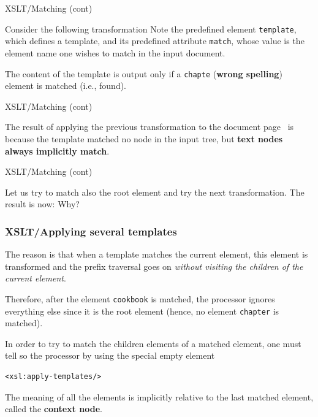 %
\begin{frame}{XSLT/Matching (cont)}

Consider the following \XSLT transformation
Note the \XSLT predefined element \texttt{template}, which defines a
template, and its predefined attribute \texttt{match}, whose value is
the element name one wishes to match in the input \XML document.

The content of the template is output only if a \texttt{chapte}
(\textbf{wrong spelling}) element is matched (i.e., found).

\end{frame}

%
\begin{frame}{XSLT/Matching (cont)}

The result of applying the previous transformation to the document
page~\pageref{cookbook.xml} is 
because the template matched no node in the input tree, but
\textbf{text nodes always implicitly match}.

\end{frame}

%
\begin{frame}{XSLT/Matching (cont)}
\label{chapters.xsl}

Let us try to match also the root element and try the next
transformation.
The result is now:
Why?

\end{frame}

%
\begin{frame}[containsverbatim]
\frametitle{XSLT/Applying several templates}

The reason is that when a template matches the current element, this
element is transformed and the prefix traversal goes on \emph{without
  visiting the children of the current element}.

\bigskip

Therefore, after the element \texttt{cookbook} is matched, the \XSLT
processor ignores everything else since it is the root element
(hence, no element \texttt{chapter} is matched).

\bigskip

In order to try to match the children elements of a matched element,
one must tell so the processor by using the special empty element
{\small
\begin{verbatim}
<xsl:apply-templates/>
\end{verbatim}
}
The meaning of all the \XSLT elements is implicitly relative to the
last matched element, called the \textbf{context node}.

\end{frame}


